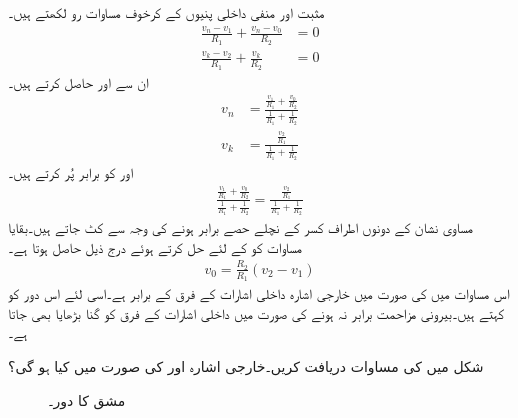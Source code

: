 مثبت اور منفی داخلی پنیوں کے کرخوف مساوات رو لکھتے ہیں۔
\begin{align*}
\frac{v_n-v_1}{R_1}+\frac{v_n-v_0}{R_2}&=0\\
\frac{v_k-v_2}{R_1}+\frac{v_k}{R_2}&=0
\end{align*}
ان سے  اور  حاصل کرتے ہیں۔
\begin{align*}
v_n&=\frac{\frac{v_1}{R_1}+\frac{v_0}{R_2}}{\frac{1}{R_1}+\frac{1}{R_2}}\\
v_k&=\frac{\frac{v_2}{R_1}}{\frac{1}{R_1}+\frac{1}{R_2}}
\end{align*}
 اور  کو برابر پُر کرتے ہیں۔
\begin{align*}
\frac{\frac{v_1}{R_1}+\frac{v_0}{R_2}}{\frac{1}{R_1}+\frac{1}{R_2}}=\frac{\frac{v_2}{R_1}}{\frac{1}{R_1}+\frac{1}{R_2}}
\end{align*}
مساوی نشان کے دونوں اطراف کسر کے نچلے حصے برابر ہونے کی وجہ سے کٹ جاتے ہیں۔بقایا مساوات کو  کے لئے حل کرتے ہوئے درج ذیل حاصل ہوتا ہے۔ 
\begin{align}
v_0=\frac{R_2}{R_1} \left(v_2-v_1\right)
\end{align} 
اس مساوات میں  کی صورت میں خارجی اشارہ داخلی اشارات کے فرق کے برابر ہے۔اسی لئے اس دور کو  کہتے ہیں۔بیرونی مزاحمت برابر نہ ہونے کی صورت میں داخلی اشارات کے فرق کو  گنا بڑھایا بھی جاتا ہے۔

شکل  میں  کی مساوات دریافت کریں۔خارجی اشارہ  اور
  کی صورت میں کیا ہو گی؟

\begin{figure}
\centering
{}
\caption{مشق  کا دور۔}
\label{شکل_حسابی_مثال_منفی_کار}
\end{figure}

